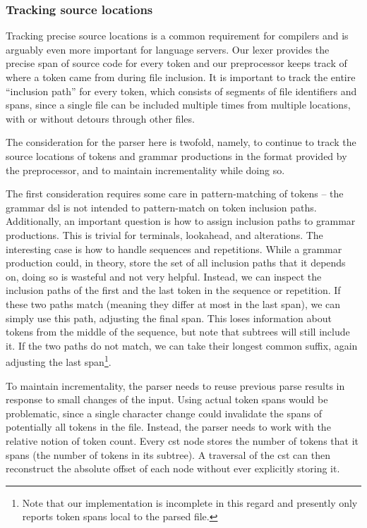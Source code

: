 \subsubsection*{Tracking source locations}

Tracking precise source locations is a common requirement for compilers and is
arguably even more important for language servers. Our lexer provides the
precise span of source code for every token and our preprocessor keeps track of
where a token came from during file inclusion. It is important to track the
entire ``inclusion path'' for every token, which consists of segments of file
identifiers and spans, since a single file can be included multiple times from
multiple locations, with or without detours through other files.

The consideration for the parser here is twofold, namely, to continue to track
the source locations of tokens and grammar productions in the format provided by
the preprocessor, and to maintain incrementality while doing so.

The first consideration requires some care in pattern-matching of tokens -- the
grammar \acrshort{dsl} is not intended to pattern-match on token inclusion
paths. Additionally, an important question is how to assign inclusion paths to
grammar productions. This is trivial for terminals, lookahead, and alterations.
The interesting case is how to handle sequences and repetitions. While a grammar
production could, in theory, store the set of all inclusion paths that it
depends on, doing so is wasteful and not very helpful. Instead, we can inspect
the inclusion paths of the first and the last token in the sequence or
repetition. If these two paths match (meaning they differ at most in the last
span), we can simply use this path, adjusting the final span. This loses
information about tokens from the middle of the sequence, but note that subtrees
will still include it. If the two paths do not match, we can take their longest
common suffix, again adjusting the last span\footnote{Note that our
implementation is incomplete in this regard and presently only reports token
spans local to the parsed file.}.

To maintain incrementality, the parser needs to reuse previous parse results in
response to small changes of the input. Using actual token spans would be
problematic, since a single character change could invalidate the spans of
potentially all tokens in the file. Instead, the parser needs to work with the
relative notion of token count. Every \acrshort{cst} node stores the number of
tokens that it spans (the number of tokens in its subtree). A traversal of the
\acrshort{cst} can then reconstruct the absolute offset of each node without
ever explicitly storing it.

